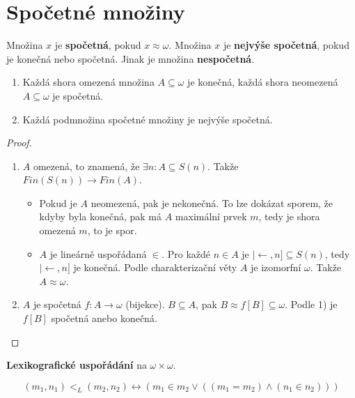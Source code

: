 \section{Spočetné množiny}

\begin{definice}
	Množina $x$ je \textbf{spočetná}, pokud $x \approx \omega$. Množina $x$ je \textbf{nejvýše spočetná}, pokud je konečná nebo spočetná. Jinak je množina \textbf{nespočetná}.
\end{definice}

\begin{thm}
	\begin{enumerate}
		\item Každá shora omezená množina $A \subseteq \omega$ je konečná, každá shora neomezená $A \subseteq \omega$ je spočetná.
		\item Každá podmnožina spočetné množiny je nejvýše spočetná.
	\end{enumerate}
\end{thm}

\begin{proof}
	\begin{enumerate}
		\item $A$ omezená, to znamená, že $\exists n: A \subseteq S(n)$. Takže $Fin(S(n)) \rightarrow Fin(A)$.
		\begin{itemize}
			\item Pokud je $A$ neomezená, pak je nekonečná. To lze dokázat sporem, že kdyby byla konečná, pak má $A$ maximální prvek $m$, tedy je shora omezená $m$, to je spor.
			\item $A$ je lineárně uspořádaná $\in$. Pro každé $n \in A$ je $|\leftarrow ,n] \subseteq S(n)$, tedy $|\leftarrow ,n ]$ je konečná. Podle charakterizační věty $A$ je izomorfní $\omega$. Takže $A \approx \omega$.
		\end{itemize}
		\item $A$ je spočetná $f: A \to \omega$ (bijekce). $B \subseteq A$, pak $B \approx f[B] \subseteq \omega$. Podle 1) je $f[B]$ spočetná anebo konečná.
	\end{enumerate}
\end{proof}

\begin{prikl}
	\textbf{Lexikografické uspořádání} na $\omega \times \omega$.
	
	$$
	(m_{1},n_{1}) <_{L} (m_{2},n_{2}) \leftrightarrow (m_{1} \in m_{2} \lor ((m_{1} = m_{2}) \land (n_{1} \in n_{2})))
	$$
\end{prikl}

